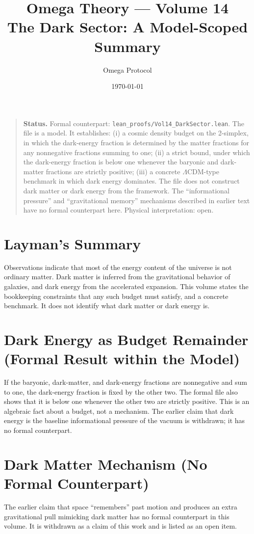 \documentclass[11pt, a4paper]{article}
\title{Omega Theory --- Volume 14\\\Large The Dark Sector: A Model-Scoped Summary}
\author{Omega Protocol}
\date{\today}
\begin{document}
\maketitle

\begin{quote}
\textbf{Status.} Formal counterpart: \texttt{lean\_proofs/Vol14\_DarkSector.lean}. The file is a model. It establishes: (i) a cosmic density budget on the 2-simplex, in which the dark-energy fraction is determined by the matter fractions for any nonnegative fractions summing to one; (ii) a strict bound, under which the dark-energy fraction is below one whenever the baryonic and dark-matter fractions are strictly positive; (iii) a concrete $\Lambda$CDM-type benchmark in which dark energy dominates. The file does not construct dark matter or dark energy from the framework. The ``informational pressure'' and ``gravitational memory'' mechanisms described in earlier text have no formal counterpart here. Physical interpretation: open.
\end{quote}

\section*{Layman's Summary}
Observations indicate that most of the energy content of the universe is not ordinary matter. Dark matter is inferred from the gravitational behavior of galaxies, and dark energy from the accelerated expansion. This volume states the bookkeeping constraints that any such budget must satisfy, and a concrete benchmark. It does not identify what dark matter or dark energy is.

\section{Dark Energy as Budget Remainder (Formal Result within the Model)}
If the baryonic, dark-matter, and dark-energy fractions are nonnegative and sum to one, the dark-energy fraction is fixed by the other two. The formal file also shows that it is below one whenever the other two are strictly positive. This is an algebraic fact about a budget, not a mechanism. The earlier claim that dark energy is the baseline informational pressure of the vacuum is withdrawn; it has no formal counterpart.

\section{Dark Matter Mechanism (No Formal Counterpart)}
The earlier claim that space ``remembers'' past motion and produces an extra gravitational pull mimicking dark matter has no formal counterpart in this volume. It is withdrawn as a claim of this work and is listed as an open item.
\end{document}
